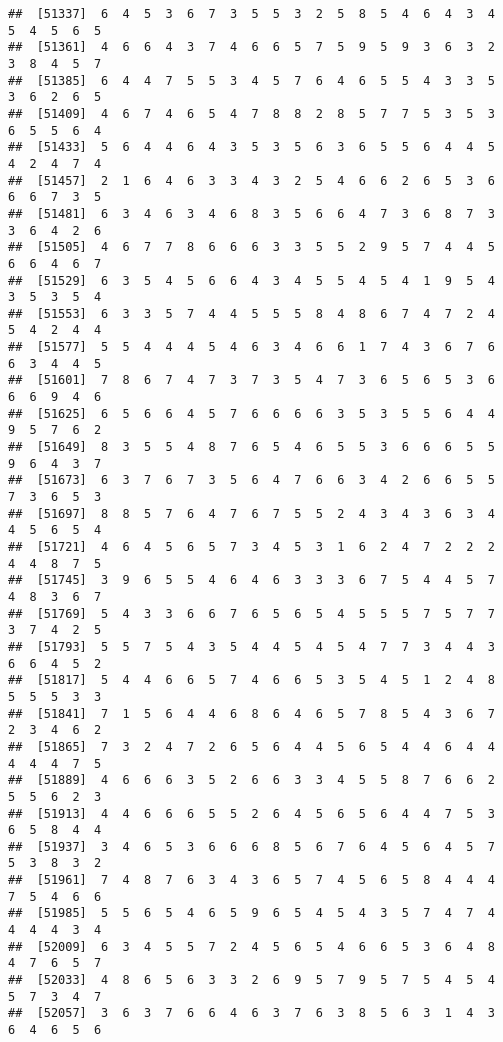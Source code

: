 \documentclass[
]{book}
\begin{document}
\begin{verbatim}
##  [51337]  6  4  5  3  6  7  3  5  5  3  2  5  8  5  4  6  4  3  4  5  4  5  6  5
##  [51361]  4  6  6  4  3  7  4  6  6  5  7  5  9  5  9  3  6  3  2  3  8  4  5  7
##  [51385]  6  4  4  7  5  5  3  4  5  7  6  4  6  5  5  4  3  3  5  3  6  2  6  5
##  [51409]  4  6  7  4  6  5  4  7  8  8  2  8  5  7  7  5  3  5  3  6  5  5  6  4
##  [51433]  5  6  4  4  6  4  3  5  3  5  6  3  6  5  5  6  4  4  5  4  2  4  7  4
##  [51457]  2  1  6  4  6  3  3  4  3  2  5  4  6  6  2  6  5  3  6  6  6  7  3  5
##  [51481]  6  3  4  6  3  4  6  8  3  5  6  6  4  7  3  6  8  7  3  3  6  4  2  6
##  [51505]  4  6  7  7  8  6  6  6  3  3  5  5  2  9  5  7  4  4  5  6  6  4  6  7
##  [51529]  6  3  5  4  5  6  6  4  3  4  5  5  4  5  4  1  9  5  4  3  5  3  5  4
##  [51553]  6  3  3  5  7  4  4  5  5  5  8  4  8  6  7  4  7  2  4  5  4  2  4  4
##  [51577]  5  5  4  4  4  5  4  6  3  4  6  6  1  7  4  3  6  7  6  6  3  4  4  5
##  [51601]  7  8  6  7  4  7  3  7  3  5  4  7  3  6  5  6  5  3  6  6  6  9  4  6
##  [51625]  6  5  6  6  4  5  7  6  6  6  6  3  5  3  5  5  6  4  4  9  5  7  6  2
##  [51649]  8  3  5  5  4  8  7  6  5  4  6  5  5  3  6  6  6  5  5  9  6  4  3  7
##  [51673]  6  3  7  6  7  3  5  6  4  7  6  6  3  4  2  6  6  5  5  7  3  6  5  3
##  [51697]  8  8  5  7  6  4  7  6  7  5  5  2  4  3  4  3  6  3  4  4  5  6  5  4
##  [51721]  4  6  4  5  6  5  7  3  4  5  3  1  6  2  4  7  2  2  2  4  4  8  7  5
##  [51745]  3  9  6  5  5  4  6  4  6  3  3  3  6  7  5  4  4  5  7  4  8  3  6  7
##  [51769]  5  4  3  3  6  6  7  6  5  6  5  4  5  5  5  7  5  7  7  3  7  4  2  5
##  [51793]  5  5  7  5  4  3  5  4  4  5  4  5  4  7  7  3  4  4  3  6  6  4  5  2
##  [51817]  5  4  4  6  6  5  7  4  6  6  5  3  5  4  5  1  2  4  8  5  5  5  3  3
##  [51841]  7  1  5  6  4  4  6  8  6  4  6  5  7  8  5  4  3  6  7  2  3  4  6  2
##  [51865]  7  3  2  4  7  2  6  5  6  4  4  5  6  5  4  4  6  4  4  4  4  4  7  5
##  [51889]  4  6  6  6  3  5  2  6  6  3  3  4  5  5  8  7  6  6  2  5  5  6  2  3
##  [51913]  4  4  6  6  6  5  5  2  6  4  5  6  5  6  4  4  7  5  3  6  5  8  4  4
##  [51937]  3  4  6  5  3  6  6  6  8  5  6  7  6  4  5  6  4  5  7  5  3  8  3  2
##  [51961]  7  4  8  7  6  3  4  3  6  5  7  4  5  6  5  8  4  4  4  7  5  4  6  6
##  [51985]  5  5  6  5  4  6  5  9  6  5  4  5  4  3  5  7  4  7  4  4  4  4  3  4
##  [52009]  6  3  4  5  5  7  2  4  5  6  5  4  6  6  5  3  6  4  8  4  7  6  5  7
##  [52033]  4  8  6  5  6  3  3  2  6  9  5  7  9  5  7  5  4  5  4  5  7  3  4  7
##  [52057]  3  6  3  7  6  6  4  6  3  7  6  3  8  5  6  3  1  4  3  6  4  6  5  6

\end{verbatim}
\end{document}
